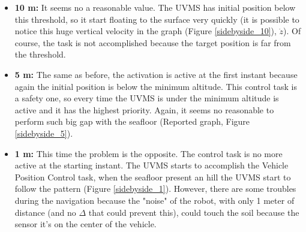 \documentclass{article}
\begin{document}
\begin{itemize}
    \item \textbf{10 m:} It seems no a reasonable value. The UVMS has initial position below this threshold, so it start floating to the surface very quickly (it is possible to notice this huge vertical velocity in the graph (Figure \ref{sidebyside_10}), $\dot{z}$). Of course, the task is not accomplished because the target position is far from the threshold.
    \item \textbf{5 m:} The same as before, the activation is active at the first instant because again the initial position is below the minimum altitude. This control task is a safety one, so every time the UVMS is under the minimum altitude is active and it has the highest priority. Again, it seems no reasonable to perform such big gap with the seafloor (Reported graph, Figure \ref{sidebyside_5}).
    \item \textbf{1 m:} This time the problem is the opposite. The control task is no more active at the starting instant. The UVMS starts to accomplish the Vehicle Position Control task, when the seafloor present an hill the UVMS start to follow the pattern (Figure \ref{sidebyside_1}). However, there are some troubles during the navigation because the "noise" of the robot, with only 1 meter of distance (and no $\Delta$ that could prevent this), could touch the soil because the sensor it's on the center of the vehicle.
\end{itemize}
\end{document}
